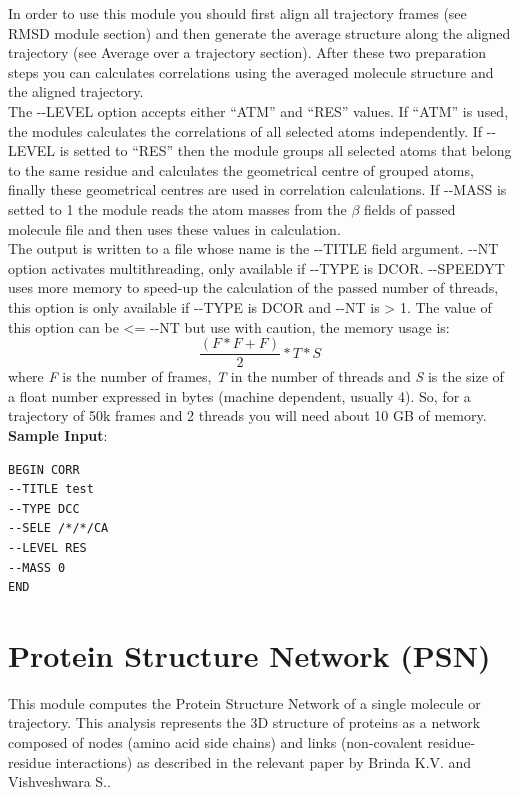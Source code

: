 \documentclass[11pt,twoside,onecolumn,a4paper,openright,notitlepage]{book}[2001/04/21]
\begin{document}
In order to use this module you should first align all trajectory frames (see RMSD module section) and then generate the average structure along the aligned trajectory (see Average over a trajectory section). After these two preparation steps you can calculates correlations using the averaged molecule structure and the aligned trajectory.\\
The -{}-LEVEL option accepts either ``ATM'' and ``RES'' values. If ``ATM'' is used, the modules calculates the correlations of all selected atoms independently. If -{}-LEVEL is setted to ``RES'' then the module groups all selected atoms that belong to the same residue and calculates the geometrical centre of grouped atoms, finally these geometrical centres are used in correlation calculations. If -{}-MASS is setted to 1 the module reads the atom masses from the $\beta{}$ fields of passed molecule file and then uses these values in calculation.\\
The output is written to a file whose name is the -{}-TITLE field argument.
-{}-NT option activates multithreading, only available if -{}-TYPE is DCOR.
-{}-SPEEDYT uses more memory to speed-up the calculation of the passed number of threads, this option is only available if -{}-TYPE is DCOR and -{}-NT is > 1. The value of this option can be <= -{}-NT but use with caution, the memory usage is:
\begin{equation}
\frac{(F*F+F)}{2}*T*S
\end{equation}
where \textit{F} is the number of frames, \textit{T} in the number of threads and \textit{S} is the size of a float number expressed in bytes (machine dependent, usually 4).
So, for a trajectory of 50k frames and 2 threads you will need about 10 GB of memory.\\

\textbf{\large Sample Input}:
\begin{verbatim}
BEGIN CORR
--TITLE test
--TYPE DCC
--SELE /*/*/CA
--LEVEL RES
--MASS 0
END
\end{verbatim}
\clearpage

\section{Protein Structure Network (PSN)\label{psn}}

This module computes the Protein Structure Network of a single molecule or trajectory.
This analysis represents the 3D structure of proteins as a network composed of nodes (amino acid side
chains) and links (non-covalent residue-residue interactions) as described in the relevant paper by
Brinda K.V. and Vishveshwara S.\cite{brinda05}.\\
\end{document}

